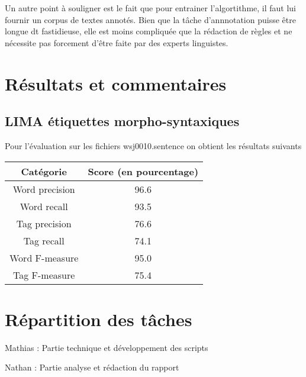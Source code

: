 \documentclass[12pt]{report}
\begin{document}
Un autre point à souligner est le fait que pour entrainer l'algortithme, il faut lui fournir un corpus de textes annotés. Bien que la tâche d'annnotation puisse être longue dt fastidieuse, elle est moins compliquée que la rédaction de règles et ne nécessite pas forcement d'être faite par des experts linguistes.

\newpage
\section{Résultats et commentaires}
\subsection{LIMA étiquettes morpho-syntaxiques}

Pour l'évaluation sur les fichiers wsj0010.sentence on obtient les résultats suivants

\begin{tabular}{c c}
\hline
  Catégorie & Score (en pourcentage) \\
\hline
    Word precision & 96.6 \\
    Word recall & 93.5 \\
    Tag precision & 76.6 \\
    Tag recall & 74.1 \\
    Word F-measure & 95.0 \\
    Tag F-measure & 75.4 \\
    
\end{tabular}





\newpage
\section{Répartition des tâches}

Mathias : Partie technique et développement des scripts

Nathan :  Partie analyse et rédaction du rapport


\newpage

 
\end{document}
